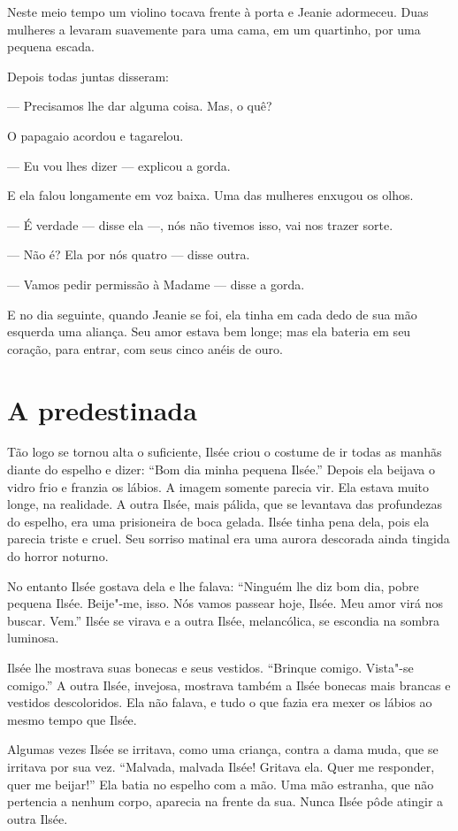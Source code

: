 Neste meio tempo um violino tocava frente à porta e Jeanie adormeceu.
Duas mulheres a levaram suavemente para uma cama, em um quartinho, por uma
pequena escada.

Depois todas juntas disseram:

--- Precisamos lhe dar alguma coisa. Mas, o quê?

O papagaio acordou e tagarelou.

--- Eu vou lhes dizer --- explicou a gorda.

E ela falou longamente em voz baixa. Uma das mulheres enxugou os olhos.

--- É verdade --- disse ela ---, nós não tivemos isso, vai nos trazer sorte.

--- Não é? Ela por nós quatro --- disse outra.

--- Vamos pedir permissão à Madame --- disse a gorda.

E no dia seguinte, quando Jeanie se foi, ela tinha em cada dedo de sua
mão esquerda uma aliança. Seu amor estava bem longe; mas ela bateria em
seu coração, para entrar, com seus cinco anéis de ouro.

\section*{A predestinada}

Tão logo se tornou alta o suficiente, Ilsée criou o costume de ir todas
as manhãs diante do espelho e dizer: “Bom dia minha pequena Ilsée.” Depois
ela beijava o vidro frio e franzia os lábios. A imagem somente parecia
vir. Ela estava muito longe, na realidade. A outra Ilsée, mais pálida, que
se levantava das profundezas do espelho, era uma prisioneira de boca
gelada. Ilsée tinha pena dela, pois ela parecia triste e cruel. Seu
sorriso matinal era uma aurora descorada ainda tingida do horror noturno.

No entanto Ilsée gostava dela e lhe falava: “Ninguém lhe diz bom dia,
pobre pequena Ilsée. Beije"-me, isso. Nós vamos passear hoje, Ilsée. Meu
amor virá nos buscar. Vem.” Ilsée se virava e a outra Ilsée, melancólica,
se escondia na sombra luminosa.

Ilsée lhe mostrava suas bonecas e seus vestidos. “Brinque comigo.
Vista"-se comigo.” A outra Ilsée, invejosa, mostrava também a Ilsée bonecas
mais brancas e vestidos descoloridos. Ela não falava, e tudo o que fazia
era mexer os lábios ao mesmo tempo que Ilsée.

Algumas vezes Ilsée se irritava, como uma criança, contra a dama muda,
que se irritava por sua vez. “Malvada, malvada Ilsée! Gritava ela. Quer me
responder, quer me beijar!” Ela batia no espelho com a mão. Uma mão estranha, que
não pertencia a nenhum corpo, aparecia na frente da sua. Nunca Ilsée pôde
atingir a outra Ilsée.

